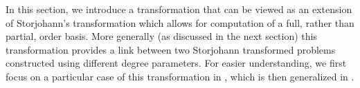 \begin{comment}
\begin{itemize}
\item $\vec{e}$: uniform 0 shift used for transformation. 
\item $\vec{s}$: original input shift 
\item $\vec{t}$: output shifted degrees of the current basis, with result
from previous subproblems included. i.e., $\left[\vec{s},0,\dots,0\right]$-degrees
of the current basis. 
\item $\vec{b},\vec{a}$: input shift and output shifted degrees for each
reduced subproblem that calls OrderBasis. In the iterative computational
process, input shift $\vec{b}^{\left(i-1\right)}$ corresponds to
input shift $\vec{a}^{\left(i\right)}$. The high degree entries of
$\vec{a}^{\left(i\right)}$ at iteration $i$ is then used as the
input shift $\vec{b}^{\left(i\right)}$ for iteration $i$. 
\end{itemize}
\item dimension:

\begin{itemize}
\item $m,n$: row, column dimension 
\item $k$: number of columns with $\left[\vec{s},0,\dots,0\right]$-degrees
less than degree bound 
\item $l$: number of block rows 
\end{itemize}
\item degrees, order:

\begin{itemize}
\item $\sigma$: order 
\item $\delta$: degree bound 
\item $d$: average degree (=$m\sigma/n$) 
\end{itemize}
\end{itemize}

\end{comment}
{}

In this section, we introduce a transformation that can be viewed
as an extension of Storjohann's transformation which allows for computation
of a full, rather than partial, order basis. More generally (as discussed
in the next section) this transformation provides a link between two
Storjohann transformed problems constructed using different degree
parameters. For easier understanding, we first focus on a particular
case of this transformation in , which
is then generalized in .


